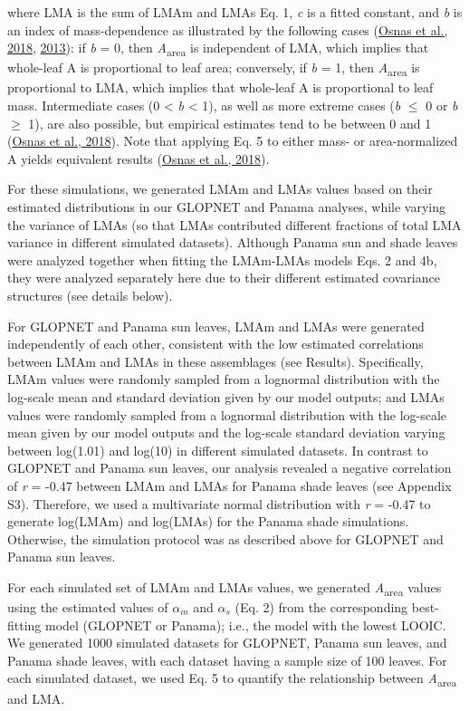 \documentclass[
  12pt,
  letterpaper,
  DIV=11,
  numbers=noendperiod]{scrartcl}
\begin{document}
where LMA is the sum of LMAm and LMAs Eq. 1, \emph{c} is a fitted
constant, and \emph{b} is an index of mass-dependence as illustrated by
the following cases (\protect\hyperlink{ref-Osnas2018}{Osnas et al.,
2018}, \protect\hyperlink{ref-Osnas2013}{2013}): if \emph{b} = 0, then
\emph{A}\textsubscript{area} is independent of LMA, which implies that
whole-leaf A is proportional to leaf area; conversely, if \emph{b} = 1,
then \emph{A}\textsubscript{area} is proportional to LMA, which implies
that whole-leaf A is proportional to leaf mass. Intermediate cases (0
\textless{} \emph{b} \textless{} 1), as well as more extreme cases
(\emph{b} \(\le\) 0 or \emph{b} \(\geq\) 1), are also possible, but
empirical estimates tend to be between 0 and 1
(\protect\hyperlink{ref-Osnas2018}{Osnas et al., 2018}). Note that
applying Eq. 5 to either mass- or area-normalized A yields equivalent
results (\protect\hyperlink{ref-Osnas2018}{Osnas et al., 2018}).

For these simulations, we generated LMAm and LMAs values based on their
estimated distributions in our GLOPNET and Panama analyses, while
varying the variance of LMAs (so that LMAs contributed different
fractions of total LMA variance in different simulated datasets).
Although Panama sun and shade leaves were analyzed together when fitting
the LMAm-LMAs models Eqs. 2 and 4b, they were analyzed separately here
due to their different estimated covariance structures (see details
below).

For GLOPNET and Panama sun leaves, LMAm and LMAs were generated
independently of each other, consistent with the low estimated
correlations between LMAm and LMAs in these assemblages (see Results).
Specifically, LMAm values were randomly sampled from a lognormal
distribution with the log-scale mean and standard deviation given by our
model outputs; and LMAs values were randomly sampled from a lognormal
distribution with the log-scale mean given by our model outputs and the
log-scale standard deviation varying between log(1.01) and log(10) in
different simulated datasets. In contrast to GLOPNET and Panama sun
leaves, our analysis revealed a negative correlation of \emph{r} = -0.47
between LMAm and LMAs for Panama shade leaves (see Appendix S3).
Therefore, we used a multivariate normal distribution with \emph{r} =
-0.47 to generate log(LMAm) and log(LMAs) for the Panama shade
simulations. Otherwise, the simulation protocol was as described above
for GLOPNET and Panama sun leaves.

For each simulated set of LMAm and LMAs values, we generated
\emph{A}\textsubscript{area} values using the estimated values of
\(\alpha_m\) and \(\alpha_s\) (Eq. 2) from the corresponding
best-fitting model (GLOPNET or Panama); i.e., the model with the lowest
LOOIC. We generated 1000 simulated datasets for GLOPNET, Panama sun
leaves, and Panama shade leaves, with each dataset having a sample size
of 100 leaves. For each simulated dataset, we used Eq. 5 to quantify the
relationship between \emph{A}\textsubscript{area} and LMA.
\end{document}
